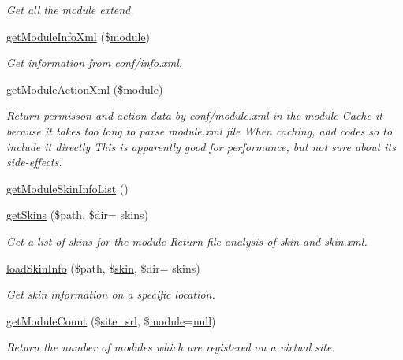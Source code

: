 \begin{DoxyCompactItemize}
\begin{DoxyCompactList}\small\item\em Get all the module extend. \end{DoxyCompactList}\item 
\hyperlink{classmoduleModel_ae4e9287674bddc605dfc4cef77f8c1bb}{get\+Module\+Info\+Xml} (\$\hyperlink{classmodule}{module})
\begin{DoxyCompactList}\small\item\em Get information from conf/info.\+xml. \end{DoxyCompactList}\item 
\hyperlink{classmoduleModel_a2d53da77f2504357f99b93a2ad09981a}{get\+Module\+Action\+Xml} (\$\hyperlink{classmodule}{module})
\begin{DoxyCompactList}\small\item\em Return permisson and action data by conf/module.\+xml in the module Cache it because it takes too long to parse module.\+xml file When caching, add codes so to include it directly This is apparently good for performance, but not sure about its side-\/effects. \end{DoxyCompactList}\item 
\hyperlink{classmoduleModel_a9fae8e7a41eda8e384cb46d25430ae82}{get\+Module\+Skin\+Info\+List} ()
\item 
\hyperlink{classmoduleModel_af48d0cb71ef8e732a67872f80d95f884}{get\+Skins} (\$path, \$dir= \textquotesingle{}skins\textquotesingle{})
\begin{DoxyCompactList}\small\item\em Get a list of skins for the module Return file analysis of skin and skin.\+xml. \end{DoxyCompactList}\item 
\hyperlink{classmoduleModel_af2f585723dfb8b8993f0e884136e45bb}{load\+Skin\+Info} (\$path, \$\hyperlink{ko_8install_8php_ab0f2b49fdb57754496b34f6b880cdeaf}{skin}, \$dir= \textquotesingle{}skins\textquotesingle{})
\begin{DoxyCompactList}\small\item\em Get skin information on a specific location. \end{DoxyCompactList}\item 
\hyperlink{classmoduleModel_a2b22943c4d212c8284ef9780e0ebf3bd}{get\+Module\+Count} (\$\hyperlink{ko_8install_8php_a8b1406b4ad1048041558dce6bfe89004}{site\+\_\+srl}, \$\hyperlink{classmodule}{module}=\hyperlink{modernizr_8min_8js_a286f9ec831c5e676eeb493248eab9575}{null})
\begin{DoxyCompactList}\small\item\em Return the number of modules which are registered on a virtual site. \end{DoxyCompactList}\item 

\end{DoxyCompactItemize}
